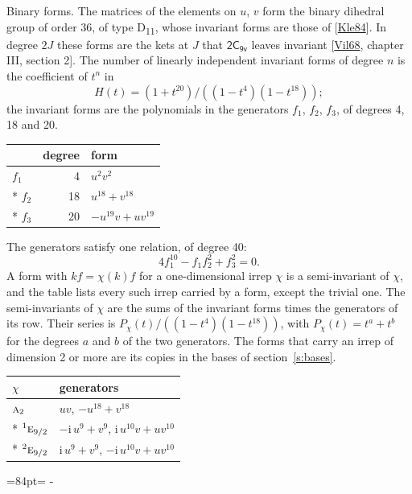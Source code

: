 \documentclass[10pt,a4paper]{article}
\makeatletter
\renewcommand\paragraph{\@startsection{paragraph}{4}{\z@}{1.5ex plus .5ex minus .2ex}{-1em}%
  {\normalfont\small\sffamily\bfseries\color{parttitle}}}
\newcommand{\needspace}[1]{\par\penalty-100\begingroup\dimen0=#1\relax\dimen2=\pagegoal
  \advance\dimen2-\pagetotal\ifdim\dimen0>\dimen2\relax\ifdim\dimen2>0pt\vfil\break\fi\fi
  \endgroup}
\numberwithin{equation}{section}
\newcommand{\grp}[1]{\mathsf{#1}}
\newcommand{\irr}[1]{\text{\normalfont\scshape #1}}
\newcommand{\conjpair}[1]{{}^{#1}}
\newcommand{\iunit}{\mathrm{i}}
\makeatother
\begin{document}
\paragraph{Binary forms.}
The matrices of the elements on $u$, $v$ form the binary dihedral group of order 36, of type D\textsubscript{11}, whose invariant forms are those of [\href{../../../REFERENCES.pdf\#ref.Kle84}{Kle84}]. In degree $2J$ these forms are the kets at $J$ that $\grp{2C_{9v}}$ leaves invariant [\href{../../../REFERENCES.pdf\#ref.Vil68}{Vil68}, chapter III, section 2]. \label{n:head.degree}\label{n:head.form}The number of linearly independent invariant forms of degree $n$ is the coefficient of $t^n$ in
\begin{equation}\label{e:molien}H(t) = (1 + t^{20})/((1-t^{4})(1-t^{18}));\end{equation}
the invariant forms are the polynomials in the generators $f_1$, $f_2$, $f_3$, of degrees 4, 18 and 20.
{\small\begin{longtable}{@{}lrl@{}}\toprule
& degree & form\\\midrule\endhead
\bottomrule\endfoot\endlastfoot
$f_{1}$ & 4 & $u^{2}v^{2}$\\*
$f_{2}$ & 18 & $u^{18} + v^{18}$\\*
$f_{3}$ & 20 & $-u^{19}v + uv^{19}$\\
\bottomrule\end{longtable}}
The generators satisfy one relation, of degree 40:
\begin{equation}\label{e:relation}4f_{1}^{10} - f_{1}f_{2}^{2} + f_{3}^{2} = 0.\end{equation}
A form with $k f = \chi(k) f$ for a one-dimensional irrep $\chi$ is a semi-invariant of $\chi$, and the table lists every such irrep carried by a form, except the trivial one. \label{n:head.generators}The semi-invariants of $\chi$ are the sums of the invariant forms times the generators of its row. Their series is $P_\chi(t)/((1-t^{4})(1-t^{18}))$, with $P_\chi(t) = t^{a} + t^{b}$ for the degrees $a$ and $b$ of the two generators. The forms that carry an irrep of dimension 2 or more are its copies in the bases of section~\ref{s:bases}.
{\small\begin{longtable}{@{}ll@{}}\toprule
$\chi$ & generators\\\midrule\endhead
\bottomrule\endfoot\endlastfoot
$\irr{a}_{2}$ & $uv$, $-u^{18} + v^{18}$\\*
$\conjpair{1}\irr{e}_{9/2}$ & $-\iunit{}\,u^{9} + v^{9}$, $\iunit{}\,u^{10}v + uv^{10}$\\*
$\conjpair{2}\irr{e}_{9/2}$ & $\iunit{}\,u^{9} + v^{9}$, $-\iunit{}\,u^{10}v + uv^{10}$\\
\bottomrule\end{longtable}}
\needspace{84pt}
\end{document}
